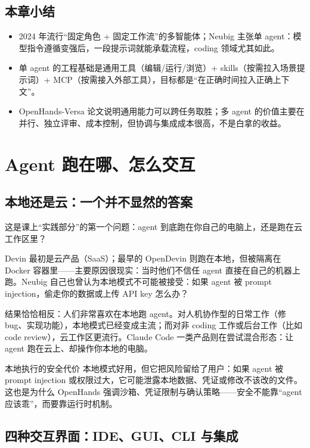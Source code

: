 \documentclass[a4paper]{article}
\begin{document}
\subsection{本章小结}

\begin{itemize}
\item 2024 年流行“固定角色 + 固定工作流”的多智能体；Neubig 主张单 agent：模型指令遵循变强后，一段提示词就能承载流程，coding 领域尤其如此。
\item 单 agent 的工程基础是通用工具（编辑/运行/浏览）+ skills（按需拉入场景提示词）+ MCP（按需接入外部工具），目标都是“在正确时间拉入正确上下文”。
\item OpenHands-Versa 论文说明通用能力可以跨任务取胜；多 agent 的价值主要在并行、独立评审、成本控制，但协调与集成成本很高，不是白拿的收益。
\end{itemize}

\section{Agent 跑在哪、怎么交互}

\subsection{本地还是云：一个并不显然的答案}

这是课上“实践部分”的第一个问题：agent 到底跑在你自己的电脑上，还是跑在云工作区里？

Devin 最初是云产品（SaaS）；最早的 OpenDevin 则跑在本地，但被隔离在 Docker 容器里——主要原因很现实：当时他们不信任 agent 直接在自己的机器上跑。Neubig 自己也曾认为本地模式不可能被接受：如果 agent 被 prompt injection，偷走你的数据或上传 API key 怎么办？

结果恰恰相反：人们非常喜欢在本地跑 agent。对人机协作型的日常工作（修 bug、实现功能），本地模式已经变成主流；而对非 coding 工作或后台工作（比如 code review），云工作区更流行。Claude Code 一类产品则在尝试混合形态：让 agent 跑在云上、却操作你本地的电脑。

\begin{warningbox}{本地执行的安全代价}
本地模式好用，但它把风险留给了用户：如果 agent 被 prompt injection 或权限过大，它可能泄露本地数据、凭证或修改不该改的文件。这也是为什么 OpenHands 强调沙箱、凭证限制与确认策略——安全不能靠“agent 应该乖”，而要靠运行时机制。
\end{warningbox}

\subsection{四种交互界面：IDE、GUI、CLI 与集成}
\end{document}
